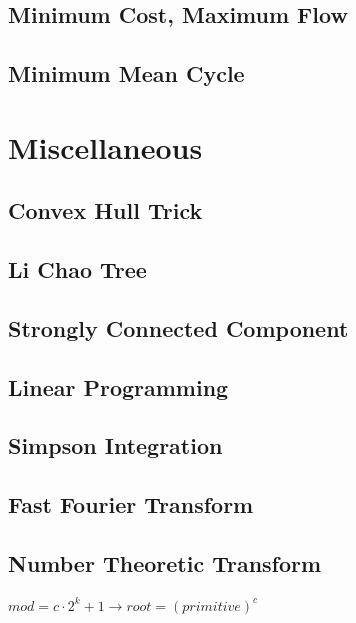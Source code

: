 \documentclass[10pt]{article}
\begin{document}
{\subsection{Minimum Cost, Maximum Flow}

\subsection{Minimum Mean Cycle}

\section{Miscellaneous}
% 
\subsection{Convex Hull Trick}

\subsection{Li Chao Tree}

\subsection{Strongly Connected Component}

\subsection{Linear Programming}

\subsection{Simpson Integration}

\subsection{Fast Fourier Transform}

\subsection{Number Theoretic Transform}
$mod = c \cdot 2^k + 1 \rightarrow root = (primitive)^c$

}
\end{document}
